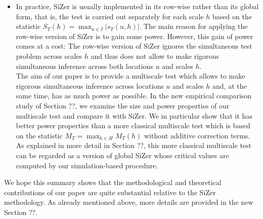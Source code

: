 \documentclass[a4paper,12pt]{article}
\begin{document}
\begin{itemize}[leftmargin=0.5cm]
\item In practice, SiZer is usually implemented in its row-wise rather than its global form, that is, the test is carried out separately for each scale $h$ based on the statistic $S_T(h) = \max_{u \in I} |s_T(u,h)|$. The main reason for applying the row-wise version of SiZer is to gain some power. However, this gain of power comes at a cost: The row-wise version of SiZer ignores the simultaneous test problem across scales $h$ and thus does not allow to make rigorous simultaneous inference across both locations $u$ and scales $h$. \\
The aim of our paper is to provide a multiscale test which allows to make rigorous simultaneous inference across locations $u$ and scales $h$ and, at the same time, has as much power as possible. 
In the new empirical comparison study of Section ??, we examine the size and power properties of our multiscale test and compare it with SiZer. We in particular show that it has better power properties than a more classical multiscale test which is based on the statistic $M_T = \max_{h \in H} M_T(h)$ without additive correction terms. As explained in more detail in Section ??, this more classical multiscale test can be regarded as a version of global SiZer whose critical values are computed by our simulation-based procedure.  

\end{itemize}

We hope this summary shows that the methodological and theoretical contributions of our paper are quite substantial relative to the SiZer methodology. As already mentioned above, more details are provided in the new Section ??.


\end{document}
